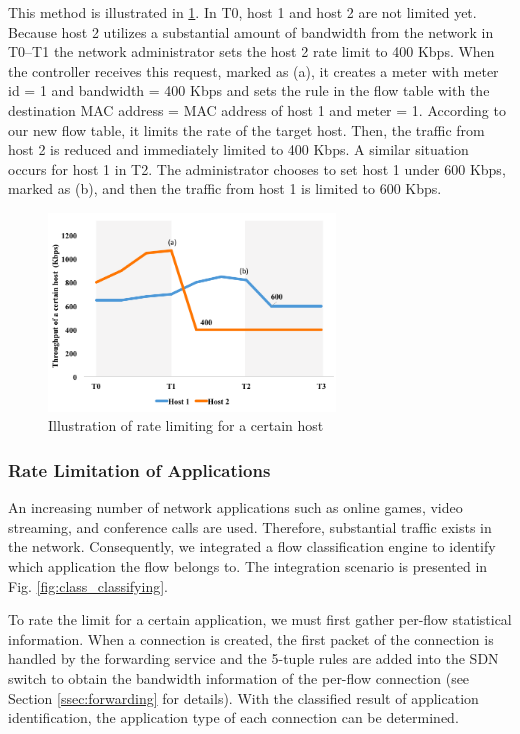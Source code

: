 \documentclass[conference]{IEEEtran}
\begin{document}
This method is illustrated in \ref{fig:mft_qos_rate_host}. In T0, host 1 and host 2 are not limited yet. Because host 2 utilizes a substantial amount of bandwidth from the network in T0–T1  the network administrator sets the host 2 rate limit to 400 Kbps. When the controller receives this request, marked as (a), it creates a meter with meter id = 1 and bandwidth = 400 Kbps and sets the rule in the flow table with the destination MAC address = MAC address of host 1 and meter = 1. According to our new flow table, it limits the rate of the target host. Then, the traffic from host 2 is reduced and immediately limited to 400 Kbps. A similar situation occurs for host 1 in T2. The administrator chooses to set host 1 under 600 Kbps, marked as (b), and then the traffic from host 1 is limited to 600 Kbps.

\begin{figure}[!t]
\centering
\includegraphics[width=3in]{./figures/mft_qos_rate_host}
\caption{Illustration of rate limiting for a certain host}
\label{fig:mft_qos_rate_host}
\end{figure}

\subsubsection{Rate Limitation of Applications}

An increasing number of network applications such as online games, video streaming, and conference calls are used. Therefore, substantial traffic exists in the network. Consequently, we integrated a flow classification engine to identify which application the flow belongs to. The integration scenario is presented in Fig. \ref{fig:class_classifying}.

To rate the limit for a certain application, we must first gather per-flow statistical information. When a connection is created, the first packet of the connection is handled by the forwarding service and the 5-tuple rules are added into the SDN switch to obtain the bandwidth information of the per-flow connection (see Section \ref{ssec:forwarding} for details). With the classified result of application identification, the application type of each connection can be determined.
\end{document}
